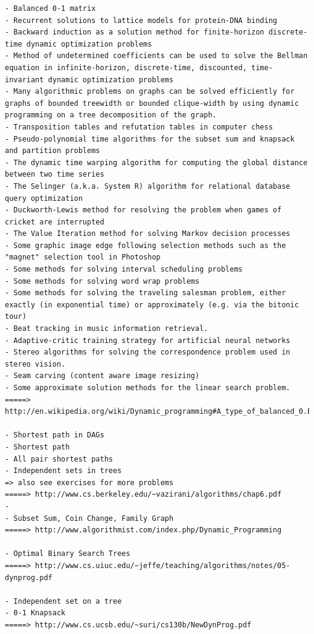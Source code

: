 \begin{verbatim}
- Balanced 0-1 matrix
- Recurrent solutions to lattice models for protein-DNA binding
- Backward induction as a solution method for finite-horizon discrete-time dynamic optimization problems
- Method of undetermined coefficients can be used to solve the Bellman equation in infinite-horizon, discrete-time, discounted, time-invariant dynamic optimization problems
- Many algorithmic problems on graphs can be solved efficiently for graphs of bounded treewidth or bounded clique-width by using dynamic programming on a tree decomposition of the graph.
- Transposition tables and refutation tables in computer chess
- Pseudo-polynomial time algorithms for the subset sum and knapsack and partition problems
- The dynamic time warping algorithm for computing the global distance between two time series
- The Selinger (a.k.a. System R) algorithm for relational database query optimization
- Duckworth-Lewis method for resolving the problem when games of cricket are interrupted
- The Value Iteration method for solving Markov decision processes
- Some graphic image edge following selection methods such as the "magnet" selection tool in Photoshop
- Some methods for solving interval scheduling problems
- Some methods for solving word wrap problems
- Some methods for solving the traveling salesman problem, either exactly (in exponential time) or approximately (e.g. via the bitonic tour)
- Beat tracking in music information retrieval.
- Adaptive-critic training strategy for artificial neural networks
- Stereo algorithms for solving the correspondence problem used in stereo vision.
- Seam carving (content aware image resizing)
- Some approximate solution methods for the linear search problem.
=====> http://en.wikipedia.org/wiki/Dynamic_programming#A_type_of_balanced_0.E2.80.931_matrix

- Shortest path in DAGs
- Shortest path
- All pair shortest paths
- Independent sets in trees
=> also see exercises for more problems
=====> http://www.cs.berkeley.edu/~vazirani/algorithms/chap6.pdf
- 
- Subset Sum, Coin Change, Family Graph
=====> http://www.algorithmist.com/index.php/Dynamic_Programming

- Optimal Binary Search Trees
=====> http://www.cs.uiuc.edu/~jeffe/teaching/algorithms/notes/05-dynprog.pdf

- Independent set on a tree
- 0-1 Knapsack
=====> http://www.cs.ucsb.edu/~suri/cs130b/NewDynProg.pdf
\end{verbatim}

\newpage
